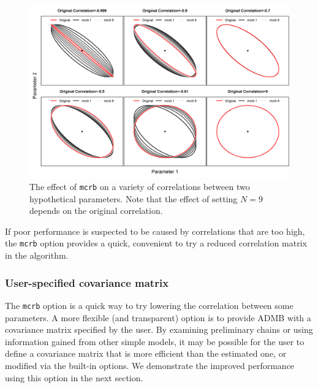 \documentclass{article}\usepackage[]{graphicx}\usepackage[]{color}
\begin{document}
\begin{figure}[h]
  \centering
  \includegraphics[width=5in]{../plots/mcrb_examples.png}
  \caption{The effect of \texttt{mcrb} on a variety of
    correlations between two hypothetical parameters. Note
    that the effect of setting $N=9$ depends on the original
    correlation.}
  \label{fig:mcrb}
\end{figure}

If poor performance is suspected to be caused by
correlations that are too high, the \texttt{mcrb} option
provides a quick, convenient to try a reduced correlation
matrix in the algorithm.

\subsubsection{User-specified covariance matrix}\label{sec:user.cov}
The \texttt{mcrb} option is a quick way to try lowering the
correlation between some parameters. A more flexible (and
transparent) option is to provide ADMB with a covariance
matrix specified by the user. By examining preliminary chains
or using information gained from other simple models, it may
be possible for the user to define a covariance matrix that
is more efficient than the estimated one, or modified via
the built-in options. We demonstrate the improved
performance using this option in the next section.
\end{document}
